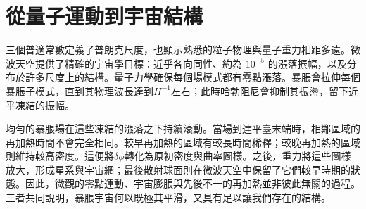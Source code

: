 \section{從量子運動到宇宙結構}

三個普適常數定義了普朗克尺度，也顯示熟悉的粒子物理與量子重力相距多遠。微波天空提供了精確的宇宙學目標：近乎各向同性、約為 \(10^{-5}\) 的漲落振幅，以及分布於許多尺度上的結構。量子力學確保每個場模式都有零點漲落。暴脹會拉伸每個暴脹子模式，直到其物理波長達到\(H^{-1}\)左右；此時哈勃阻尼會抑制其振盪，留下近乎凍結的振幅。

均勻的暴脹場在這些凍結的漲落之下持續滾動。當場到達平臺末端時，相鄰區域的再加熱時間不會完全相同。較早再加熱的區域有較長時間稀釋；較晚再加熱的區域則維持較高密度。這便將\(\delta\phi\)轉化為原初密度與曲率圖樣。之後，重力將這些圖樣放大，形成星系與宇宙網；最後散射球面則在微波天空中保留了它們較早時期的狀態。因此，微觀的零點運動、宇宙膨脹與先後不一的再加熱並非彼此無關的過程。三者共同說明，暴脹宇宙何以既極其平滑，又具有足以讓我們存在的結構。
